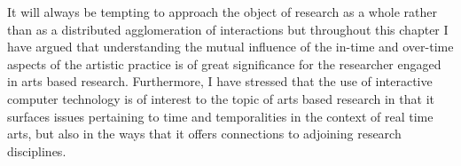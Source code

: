 
It will always be tempting to approach the object of research as a whole rather than as a distributed agglomeration of interactions but throughout this chapter I have argued that understanding the mutual influence of the in-time and over-time aspects of the artistic practice is of great significance for the researcher engaged in arts based research. Furthermore, I have stressed that the use of interactive computer technology is of interest to the topic of arts based research in that it surfaces issues pertaining to time and temporalities in the context of real time arts, but also in the ways that it offers connections to adjoining research disciplines. %








